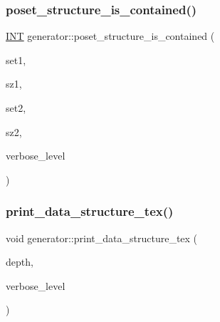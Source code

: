 \mbox{\label{classgenerator_a7744526e5820dc107488bbf0aa10a1db}} 
\subsubsection{\texorpdfstring{poset\+\_\+structure\+\_\+is\+\_\+contained()}{poset\_structure\_is\_contained()}}
{\footnotesize\ttfamily \mbox{\hyperlink{galois_8h_a09fddde158a3a20bd2dcadb609de11dc}{I\+NT}} generator\+::poset\+\_\+structure\+\_\+is\+\_\+contained (\begin{DoxyParamCaption}\item[{\mbox{\hyperlink{galois_8h_a09fddde158a3a20bd2dcadb609de11dc}{I\+NT}} $\ast$}]{set1,  }\item[{\mbox{\hyperlink{galois_8h_a09fddde158a3a20bd2dcadb609de11dc}{I\+NT}}}]{sz1,  }\item[{\mbox{\hyperlink{galois_8h_a09fddde158a3a20bd2dcadb609de11dc}{I\+NT}} $\ast$}]{set2,  }\item[{\mbox{\hyperlink{galois_8h_a09fddde158a3a20bd2dcadb609de11dc}{I\+NT}}}]{sz2,  }\item[{\mbox{\hyperlink{galois_8h_a09fddde158a3a20bd2dcadb609de11dc}{I\+NT}}}]{verbose\+\_\+level }\end{DoxyParamCaption})}

\mbox{\label{classgenerator_a77ff0106e92f1e975224b739e35ef7b5}} 
\subsubsection{\texorpdfstring{print\+\_\+data\+\_\+structure\+\_\+tex()}{print\_data\_structure\_tex()}}
{\footnotesize\ttfamily void generator\+::print\+\_\+data\+\_\+structure\+\_\+tex (\begin{DoxyParamCaption}\item[{\mbox{\hyperlink{galois_8h_a09fddde158a3a20bd2dcadb609de11dc}{I\+NT}}}]{depth,  }\item[{\mbox{\hyperlink{galois_8h_a09fddde158a3a20bd2dcadb609de11dc}{I\+NT}}}]{verbose\+\_\+level }\end{DoxyParamCaption})}

